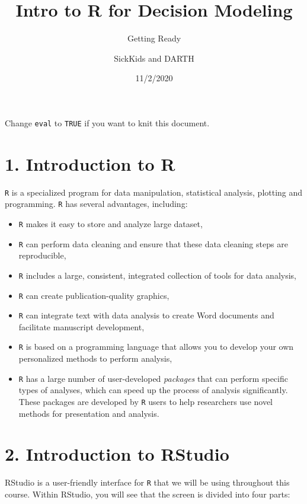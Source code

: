 \documentclass[
]{article}
\title{Intro to R for Decision Modeling}
\subtitle{Getting Ready}
\author{SickKids and DARTH}
\date{11/2/2020}
\begin{document}
\maketitle

Change \texttt{eval} to \texttt{TRUE} if you want to knit this document.

\hypertarget{introduction-to-r}{%
\section{1. Introduction to R}\label{introduction-to-r}}

\texttt{R} is a specialized program for data manipulation, statistical
analysis, plotting and programming. \texttt{R} has several advantages,
including:

\begin{itemize}
\item
  \texttt{R} makes it easy to store and analyze large dataset,
\item
  \texttt{R} can perform data cleaning and ensure that these data
  cleaning steps are reproducible,
\item
  \texttt{R} includes a large, consistent, integrated collection of
  tools for data analysis,
\item
  \texttt{R} can create publication-quality graphics,
\item
  \texttt{R} can integrate text with data analysis to create Word
  documents and facilitate manuscript development,
\item
  \texttt{R} is based on a programming language that allows you to
  develop your own personalized methods to perform analysis,
\item
  \texttt{R} has a large number of user-developed \emph{packages} that
  can perform specific types of analyses, which can speed up the process
  of analysis significantly. These packages are developed by \texttt{R}
  users to help researchers use novel methods for presentation and
  analysis.
\end{itemize}

\hypertarget{introduction-to-rstudio}{%
\section{2. Introduction to RStudio}\label{introduction-to-rstudio}}

RStudio is a user-friendly interface for \texttt{R} that we will be
using throughout this course. Within RStudio, you will see that the
screen is divided into four parts:
\end{document}
